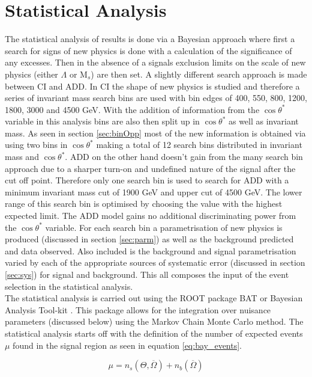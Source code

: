\chapter{Statistical Analysis}
    \label{ch:stat}

	The statistical analysis of results is done via a Bayesian approach where first a search for signs of new physics is done with a calculation of the significance of any excesses. Then in the absence of a signals exclusion limits on the scale of new physics (either $\Lambda$ or M$_{s}$) are then set. A slightly different search approach is made between CI and ADD. In CI the shape of new physics is studied and therefore a series of invariant mass search bins are used with bin edges of 400, 550, 800, 1200, 1800, 3000 and 4500 GeV. With the addition of information from the $\cos{\theta^{*}}$ variable in this analysis bins are also then split up in $\cos{\theta^{*}}$ as well as invariant mass. As seen in section \ref{sec:binOpp} most of the new information is obtained via using two bins in $\cos{\theta^{*}}$ making a total of 12 search bins distributed in invariant mass and $\cos{\theta^{*}}$. ADD on the other hand doesn't gain from the many search bin approach due to a sharper turn-on and undefined nature of the signal after the cut off point. Therefore only one search bin is used to search for ADD with a minimum invariant mass cut of 1900 GeV and upper cut of 4500 GeV. The lower range of this search bin is optimised by choosing the value with the highest expected limit. The ADD model gains no additional discriminating power from the $\cos{\theta^{*}}$ variable. For each search bin a parametrisation of new physics is produced (discussed in section \ref{sec:parm}) as well as the background predicted and data observed. Also included is the background and signal parametrisation varied by each of the appropriate sources of systematic error (discussed in section \ref{sec:sys}) for signal and background. This all composes the input of the event selection in the statistical analysis. \\

    The statistical analysis is carried out using the ROOT package BAT or Bayesian Analysis Tool-kit \cite{Caldwell20092197}. This package allows for the integration over nuisance parameters (discussed below) using the Markov Chain Monte Carlo method.  The statistical analysis starts off with the definition of the number of expected events $\mu$ found in the signal region as seen in equation \ref{eq:bay_events}.

	\begin{equation}
		\mu = n_{s}(\Theta,\overline{\Omega}) + n_{b}(\overline{\Omega})
    	\label{eq:bay_events}
    \end{equation}

